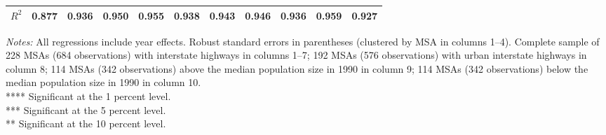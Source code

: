 \begin{table}[htbp]
\begin{tabular}{l*{10}{c}}
\(R^{2}\)           &       0.877         &       0.936         &       0.950         &       0.955         &       0.938         &       0.943         &       0.946         &       0.936         &       0.959         &       0.927         \\
\hline\hline
\end{tabular}
\begin{flushleft}
\emph{Notes:} All regressions include year effects. Robust standard errors in parentheses (clustered by MSA in columns 1–4). Complete sample of 228 MSAs (684 observations) with interstate highways in columns 1–7; 192 MSAs (576 observations) with urban interstate highways in column 8; 114 MSAs (342 observations) above the median population size in 1990 in column 9; 114 MSAs (342 observations) below the median population size in 1990 in column 10. \\         **** Significant at the 1 percent level. \\         *** Significant at the 5 percent level. \\         ** Significant at the 10 percent level.
\end{flushleft}
\end{table}
